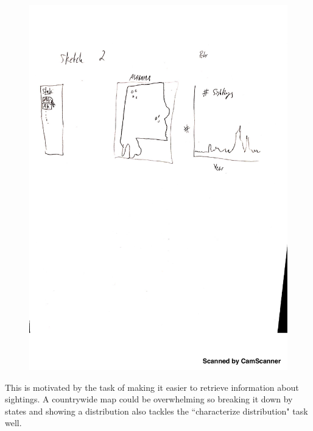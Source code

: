 \documentclass{neu_handout}
\begin{document}
\begin{figure}[h]
\centering
{
\includegraphics[width=0.7\linewidth]{peter2}
}
\end{figure}
This is motivated by the task of making it easier to retrieve information about sightings. A countrywide map could be overwhelming so breaking it down by states and showing a distribution also tackles the ``characterize distribution" task well.\\\\

\newpage
\end{document}
